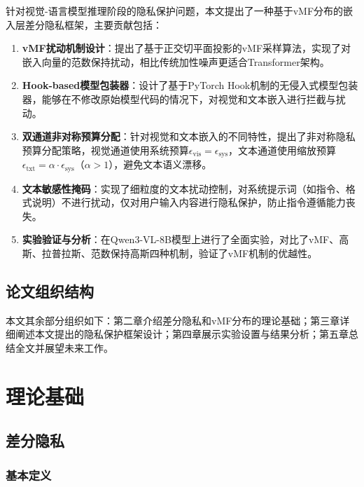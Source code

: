 \documentclass[a4paper,12pt]{article}
\begin{document}
针对视觉-语言模型推理阶段的隐私保护问题，本文提出了一种基于vMF分布的嵌入层差分隐私框架，主要贡献包括：

\begin{enumerate}
  \item \textbf{vMF扰动机制设计}：提出了基于正交切平面投影的vMF采样算法，实现了对嵌入向量的范数保持扰动，相比传统加性噪声更适合Transformer架构。

  \item \textbf{Hook-based模型包装器}：设计了基于PyTorch Hook机制的无侵入式模型包装器，能够在不修改原始模型代码的情况下，对视觉和文本嵌入进行拦截与扰动。

  \item \textbf{双通道非对称预算分配}：针对视觉和文本嵌入的不同特性，提出了非对称隐私预算分配策略，视觉通道使用系统预算$\epsilon_{\text{vis}} = \epsilon_{\text{sys}}$，文本通道使用缩放预算$\epsilon_{\text{txt}} = \alpha \cdot \epsilon_{\text{sys}}$（$\alpha > 1$），避免文本语义漂移。

  \item \textbf{文本敏感性掩码}：实现了细粒度的文本扰动控制，对系统提示词（如指令、格式说明）不进行扰动，仅对用户输入内容进行隐私保护，防止指令遵循能力丧失。

  \item \textbf{实验验证与分析}：在Qwen3-VL-8B模型上进行了全面实验，对比了vMF、高斯、拉普拉斯、范数保持高斯四种机制，验证了vMF机制的优越性。
\end{enumerate}

\subsection{论文组织结构}

本文其余部分组织如下：第二章介绍差分隐私和vMF分布的理论基础；第三章详细阐述本文提出的隐私保护框架设计；第四章展示实验设置与结果分析；第五章总结全文并展望未来工作。

\section{理论基础}

\subsection{差分隐私}

\subsubsection{基本定义}
\end{document}
